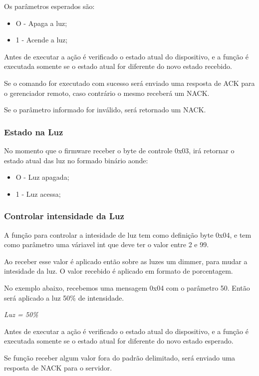 \documentclass[openright]{normas-utf-tex} %
\begin{document}
Os parâmetros esperados são:
\begin{itemize}
    \item O - Apaga a luz;
    \item 1 - Acende a luz;
\end{itemize}

Antes de executar a ação é verificado o estado atual do dispositivo, e a função é executada somente se o estado atual for diferente do novo estado recebido.

Se o comando for executado com sucesso será enviado uma resposta de ACK para o gerenciador remoto, caso contrário o mesmo receberá um NACK.

Se o parâmetro informado for inválido, será retornado um NACK.

\subsubsection{Estado na Luz}

No momento que o firmware receber o byte de controle 0x03, irá retornar o estado atual das luz no formado binário aonde:

\begin{itemize}
    \item O - Luz apagada;
    \item 1 - Luz acessa;
\end{itemize}

\subsubsection{Controlar intensidade da Luz}
A função para controlar a intesidade de luz tem como definição byte 0x04, e tem como parâmetro uma váriavel int que deve ter o valor entre 2 e 99.

Ao receber esse valor é aplicado então sobre as luzes um dimmer, para mudar a intesidade da luz. O valor recebido é aplicado em formato de porcentagem.

No exemplo abaixo, recebemos uma mensagem 0x04 com o parâmetro 50. Então será aplicado a luz 50\% de intensidade.

\begin{center}
    \textit{
    Luz =  50\%
    }
\end{center}

Antes de executar a ação é verificado o estado atual do dispositivo, e a função é executada somente se o estado atual for diferente do novo estado esperado.

Se função receber algum valor fora do padrão delimitado, será enviado uma resposta de NACK para o servidor.
\end{document}

